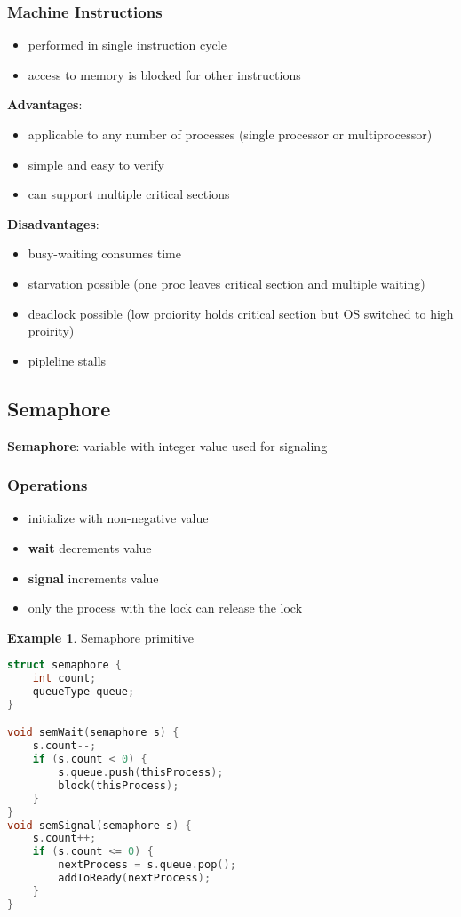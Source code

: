 \documentclass[]{article}
\theoremstyle{definition}
\newtheorem{ex}{Example}[section]
\begin{document}
			\subsubsection{Machine Instructions}
				\begin{itemize}
					\item performed in single instruction cycle
					\item access to memory is blocked for other instructions
				\end{itemize}
				\textbf{Advantages}:
				\begin{itemize}
					\item applicable to any number of processes (single processor or multiprocessor)
					\item simple and easy to verify
					\item can support multiple critical sections
				\end{itemize}
				\textbf{Disadvantages}:
				\begin{itemize}
					\item busy-waiting consumes time
					\item starvation possible (one proc leaves critical section and multiple waiting)
					\item deadlock possible (low proiority holds critical section but OS switched to high proirity)
					\item pipleline stalls
				\end{itemize}
		\subsection{Semaphore}
			\textbf{Semaphore}: variable with integer value used for signaling
			\subsubsection{Operations}
				\begin{itemize}
					\item initialize with non-negative value
					\item \textbf{wait} decrements value
					\item \textbf{signal} increments value
					\item only the process with the lock can release the lock
				\end{itemize} 
				\begin{ex}
					Semaphore primitive
					\begin{lstlisting}[language=C]
struct semaphore {
	int count;
	queueType queue;
}

void semWait(semaphore s) {
	s.count--;
	if (s.count < 0) {
		s.queue.push(thisProcess);
		block(thisProcess);
	}
}
void semSignal(semaphore s) {
	s.count++;
	if (s.count <= 0) {
		nextProcess = s.queue.pop();
		addToReady(nextProcess);
	}
}
					\end{lstlisting}
				\end{ex}
\end{document}
